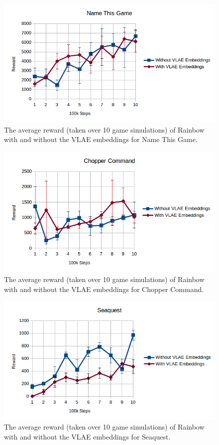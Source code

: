 \documentclass{article}
\begin{document}
\begin{figure}
  \includegraphics[width=0.8\linewidth]{name_this_game.png}
  \caption{The average reward (taken over 10 game simulations) of Rainbow with and without the VLAE embeddings for Name This Game.}
  \label{fig:name_this_game}
\end{figure}

\begin{figure}
  \includegraphics[width=0.8\linewidth]{chopper_command.png}
  \caption{The average reward (taken over 10 game simulations) of Rainbow with and without the VLAE embeddings for Chopper Command.}
  \label{fig:chopper_command}
\end{figure}

\begin{figure}
  \includegraphics[width=0.8\linewidth]{seaquest.png}
  \caption{The average reward (taken over 10 game simulations) of Rainbow with and without the VLAE embeddings for Seaquest.}
  \label{fig:seaquest}
\end{figure}
\end{document}
